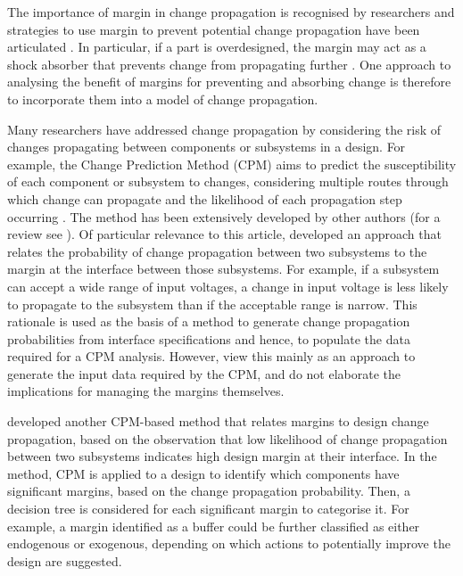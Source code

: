 The importance of margin in change propagation is recognised by researchers and strategies to use margin to prevent potential change propagation have been articulated \citep{Eckert2004}. In particular, if a part is overdesigned, the margin may act as a shock absorber that prevents change from propagating further \citep{Chua2012}. One approach to analysing the benefit of margins for preventing and absorbing change is therefore to incorporate them into a model of change propagation.

Many researchers have addressed change propagation by considering the risk of changes propagating between components or subsystems in a design. For example, the Change Prediction Method (CPM) aims to predict the susceptibility of each component or subsystem to changes, considering multiple routes through which change can propagate and the likelihood of each propagation step occurring \citep{Clarkson2004}. The method has been extensively developed by other authors (for a review see \cite{hamraz2013}). Of particular relevance to this article, \cite{Hamraz2013b} developed an approach that relates the probability of change propagation between two subsystems to the margin at the interface between those subsystems. For example, if a subsystem can accept a wide range of input voltages, a change in input voltage is less likely to propagate to the subsystem than if the acceptable range is narrow. This rationale is used as the basis of a method to generate change propagation probabilities from interface specifications and hence, to populate the data required for a CPM analysis. However, \cite{Hamraz2013b} view this mainly as an approach to generate the input data required by the CPM, and do not elaborate the implications for managing the margins themselves.

\cite{lebjioui2018} developed another CPM-based method that relates margins to design change propagation, based on the observation that low likelihood of change propagation between two subsystems indicates high design margin at their interface. In the method, CPM is applied to a design to identify which components have significant margins, based on the change propagation probability. Then, a decision tree is considered for each significant margin to categorise it. For example, a margin identified as a buffer could be further classified as either endogenous or exogenous, depending on which actions to potentially improve the design are suggested.

